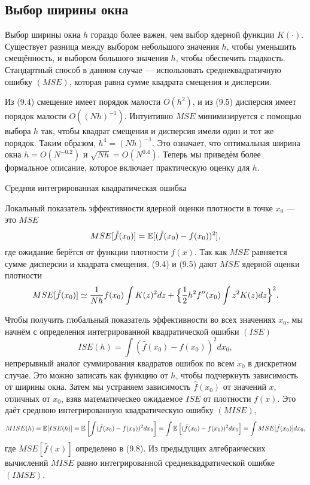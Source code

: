 \subsection{Выбор ширины окна}

Выбор ширины окна $h$ гораздо более важен, чем выбор ядерной функции $K(\cdot)$. Существует разница между выбором небольшого значения $h$, чтобы уменьшить смещённость, и выбором большого значения $h$, чтобы обеспечить гладкость. Стандартный способ в данном случае --- использовать среднеквадратичную ошибку $(MSE)$, которая равна сумме квадрата смещения и дисперсии.

Из (9.4) смещение имеет порядок малости $O(h^2)$, и из (9.5) дисперсия имеет порядок малости $O((Nh)^{-1})$. Интуитивно $MSE$ минимизируется с помощью выбора $h$ так, чтобы квадрат смещения и дисперсия имели один и тот же порядок. Таким образом, $h^4 = (Nh)^{-1}$. Это означает, что оптимальная ширина окна $h = O(N^{-0.2})$ и $\sqrt{Nh} = O(N^{0.4})$. Теперь мы приведём более формальное описание, которое включает практическую оценку для $h$.
 
\begin{center}
Cредняя интегрированная квадратическая ошибка
\end{center} 

Локальный показатель эффективности ядерной оценки плотности в точке $x_0$ --- это $MSE$ 
\begin{equation}
MSE[\hat{f}(x_0)] = \mathbb{E}[(\hat{f}(x_0) - f(x_0))^2],
\end{equation}
где ожидание берётся от функции плотности $f(x)$. Так как $MSE$ равняется сумме дисперсии и квадрата смещения, (9.4) и (9.5) дают $MSE$ ядерной оценки плотности 
\begin{equation}
MSE[\hat{f}(x_0)] \simeq \frac{1}{Nh} f(x_0) \int K(z)^2dz + \Bigl\{ \frac{1}{2}h^2 f''(x_0) \int z^2K(z)dz \Bigr\}^2.
\end{equation}

Чтобы получить глобальный показатель эффективности во всех значениях $x_0$, мы начнём с определения интегрированной квадратической ошибки $(ISE)$
\begin{equation}
ISE(h) = \int (\hat{f}(x_0) - f(x_0))^2 dx_0,
\end{equation}
непрерывный аналог суммирования квадратов ошибок по всем $x_0$ в дискретном случае. Это можно записать как функцию от $h$, чтобы подчеркнуть зависимость от ширины окна. Затем мы устраняем зависимость $\hat{f}(x_0)$ от значений $x$, отличных от $x_0$, взяв математическео ожидаемое $ISE$ от плотности $f(x)$. Это даёт среднюю интегрированную квадратическую ошибку $(MISE)$,
\[
MISE(h) = \mathbb{E}[ISE(h)] = \mathbb{E} \left[ \int (\hat{f}(x_0) - f(x_0))^2 dx_0 \right] = \int \mathbb{E} \left[(\hat{f}(x_0) - f(x_0))^2 dx_0 \right] = \int MSE[\hat{f}(x_0)]dx_0,
\]
где $MSE[\hat{f}(x)]$ определено в (9.8). Из предыдущих алгебраических вычислений $MISE$ равно интегрированной среднеквадратической ошибке $(IMSE)$.

